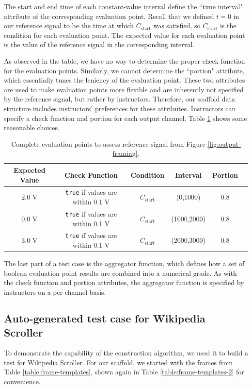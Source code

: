 \documentclass[12pt]{article}
\begin{document}
The start and end time of each constant-value interval define the ``time interval" attribute of the corresponding evaluation point.  Recall that we defined $t=0$ in our reference signal to be the time at which $C_{\text{start}}$ was satisfied, so $C_{\text{start}}$ is the condition for each evaluation point.  The expected value for each evaluation point is the value of the reference signal in the corresponding interval.

As observed in the table, we have no way to determine the proper check function for the evaluation points.  Similarly, we cannot determine the ``portion" attribute, which essentially tunes the leniency of the evaluation point.  These two attributes are used to make evaluation points more flexible and are inherently not specified by the reference signal, but rather by instructors.  Therefore, our scaffold data structure includes instructors' preferences for these attributes.  Instructors can specify a check function and portion for each output channel.  Table \ref{table:construct-points-2} shows some reasonable choices.

\begin{table}[ht]
\begin{center}
\caption{Complete evaluation points to assess reference signal from Figure \ref{fig:output-framing}.}
\label{table:construct-points-2}
\begin{tabular}{cccccc}
Expected Value & Check Function & Condition & Interval & Portion \\ \hline
2.0 V & \texttt{true} if values are within 0.1 V & $C_{\text{start}}$ & (0,1000) & 0.8 \\
0.0 V & \texttt{true} if values are within 0.1 V & $C_{\text{start}}$ & (1000,2000) & 0.8 \\
3.0 V & \texttt{true} if values are within 0.1 V & $C_{\text{start}}$ & (2000,3000) & 0.8 \\ \hline
\end{tabular}
\end{center}
\end{table}

The last part of a test case is the aggregator function, which defines how a set of boolean evaluation point results are combined into a numerical grade.  As with the check function and portion attributes, the aggregator function is specified by instructors on a per-channel basis.

\subsection{Auto-generated test case for Wikipedia Scroller}
To demonstrate the capability of the construction algorithm, we used it to build a test for Wikipedia Scroller.  For our scaffold, we started with the frames from Table \ref{table:frame-templates}, shown again in Table \ref{table:frame-templates-2} for convenience.
\end{document}
